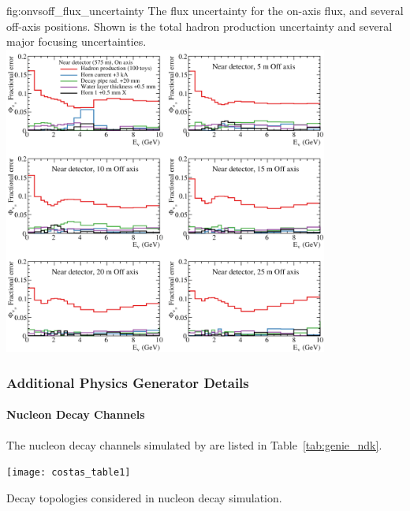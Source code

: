 
\begin{dunefigure}{fig:onvsoff_flux_uncertainty}
{The flux uncertainty for the on-axis flux, and several off-axis positions. Shown is the total hadron production uncertainty and several major focusing uncertainties.}
    \includegraphics[width=0.8\textwidth]{graphics/onaxis_vs_offaxis_uncertainties.png}
\end{dunefigure}

\subsubsection{Additional Physics Generator Details}
\label{sec:tools-app-generator}

\paragraph{Nucleon Decay Channels}

The nucleon decay channels simulated by  are listed in Table~\ref{tab:genie_ndk}.

\begin{table}
  \texttt{[image: costas\_table1]}
  
  \caption[ nucleon decay topologies]{Decay topologies considered in  nucleon decay simulation.}
  \label{tab:genie_ndk}
\end{table}












